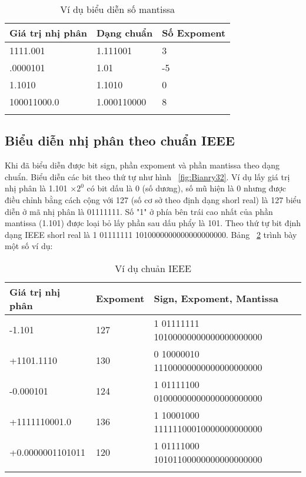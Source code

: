 	\begin{longtable}{|l|l|l|}
		\hline
			Giá trị nhị phân & Dạng chuẩn & Số Expoment \\
		\hline
		\hline
			1111.001 & 1.111001 & 3 \\
		\hline
			.0000101 & 1.01 & -5 \\
		\hline
			1.1010 & 1.1010 & 0 \\
		\hline
			100011000.0 & 1.000110000 &  8\\
		\hline
			\caption{Ví dụ biểu diễn số mantissa}
			\label{tb:VDMa}
	\end{longtable}

\subsection*{Biểu diễn nhị phân theo chuẩn IEEE}
	Khi đã biểu diễn được bit sign, phần expoment và phần mantissa theo dạng chuẩn. Biểu diễn các bit theo thứ tự như hình ~\ref{fig:Bianry32}. Ví dụ lấy giá trị nhị phân là 1.101 $\times 2^0$ có bit dấu là 0 (số dương), số mũ hiện là 0 nhưng được điều chỉnh bằng cách cộng với 127 (số cơ sở theo định dạng shorl real)  là 127 biểu diễn ở mã nhị phân là 01111111. Số "1" ở phía bên trái cao nhất của phần mantissa (1.101) được loại bỏ lấy phần sau dấu phẩy là 101. Theo thứ tự bit định dạng  IEEE shorl real là 1 01111111 1010000000000000000000. Bảng ~\ref{tb:VDIEEE} trình bày một số ví dụ:
	\begin{longtable}{|l|l|l|}
	\hline
		Giá trị nhị phân & Expoment & Sign, Expoment, Mantissa\\
	\hline
	\hline
		-1.101 & 127 & 1 01111111 10100000000000000000000 \\
	\hline
		+1101.1110 & 130 & 0 10000010 11100000000000000000000 \\
	\hline
		-0.000101 & 124 & 1 01111100 01000000000000000000000 \\
	\hline
		+1111110001.0 & 136 & 1 10001000 11111100010000000000000 \\
	\hline
		+0.0000001101011& 120 & 1 01111000 10101100000000000000000 \\
	\hline
		\caption{Ví dụ chuản IEEE}
		\label{tb:VDIEEE}
	\end{longtable}	